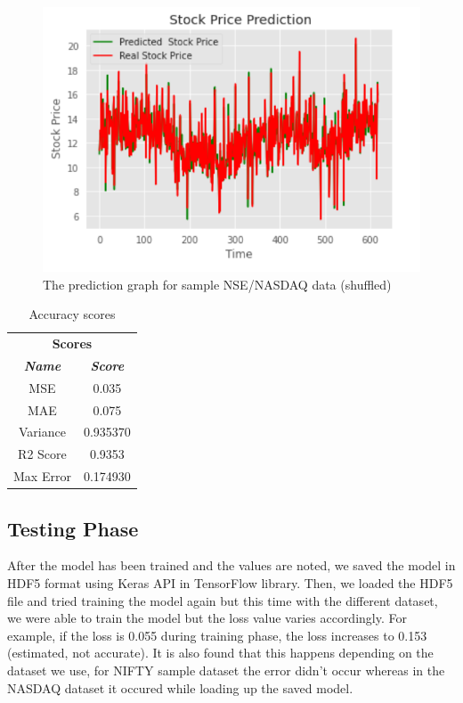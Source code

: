 \documentclass[conference]{IEEEtran}
\begin{document}
\begin{figure}[htbp]
\centerline{\includegraphics[scale=0.7]{predict_1.png}}
\caption{The prediction graph for sample NSE/NASDAQ data (shuffled)}
\label{predict-1}
\end{figure}

\begin{table}[htbp]
	\caption{Accuracy scores}
	\begin{center}
		\begin{tabular}{|c|c|}
			\hline
			\multicolumn{2}{|c|}{\textbf{Scores}} \\
			\cline{1-2} 
			\textbf{\textit{Name}}& \textbf{\textit{Score}} \\
			\hline
			MSE & 0.035 \\
			\hline
			MAE & 0.075 \\
			\hline
			Variance & 0.935370\\
			\hline
			R2 Score & 0.9353 \\
			\hline
			Max Error & 0.174930 \\
			\hline
		\end{tabular}
		\label{tab-mse}
	\end{center}
\end{table}


\subsection{Testing Phase}
After the model has been trained and the values are noted, we saved the model in HDF5 format using Keras API in TensorFlow library. Then, we loaded the HDF5 file and tried training the model again but this time with the different dataset, we were able to train the model but the loss value varies accordingly. For example, if the loss is 0.055 during training phase, the loss increases to 0.153 (estimated, not accurate). It is also found that this happens depending on the dataset we use, for NIFTY sample dataset the error didn't occur whereas in the NASDAQ dataset it occured while loading up the saved model.
\end{document}
